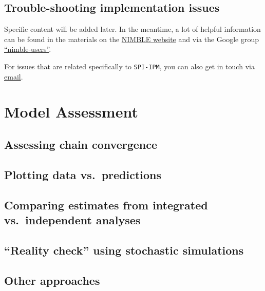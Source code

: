 \documentclass[
]{book}
\begin{document}
\hypertarget{trouble-shooting-implementation-issues}{%
\section{Trouble-shooting implementation issues}\label{trouble-shooting-implementation-issues}}

Specific content will be added later. In the meantime, a lot of helpful
information can be found in the materials on the \href{https://r-nimble.org/}{NIMBLE website}
and via the Google group \href{https://groups.google.com/g/nimble-users}{``nimble-users''}.

For issues that are related specifically to \texttt{SPI-IPM}, you can also get in touch
via \href{mailto:chloe.nater@nina.no}{email}.

\hypertarget{ModelAssm}{%
\chapter{Model Assessment}\label{ModelAssm}}

\hypertarget{assessing-chain-convergence}{%
\section{Assessing chain convergence}\label{assessing-chain-convergence}}

\hypertarget{plotting-data-vs.-predictions}{%
\section{Plotting data vs.~predictions}\label{plotting-data-vs.-predictions}}

\hypertarget{comparing-estimates-from-integrated-vs.-independent-analyses}{%
\section{Comparing estimates from integrated vs.~independent analyses}\label{comparing-estimates-from-integrated-vs.-independent-analyses}}

\hypertarget{reality-check-using-stochastic-simulations}{%
\section{``Reality check'' using stochastic simulations}\label{reality-check-using-stochastic-simulations}}

\hypertarget{other-approaches}{%
\section{Other approaches}\label{other-approaches}}
\end{document}
